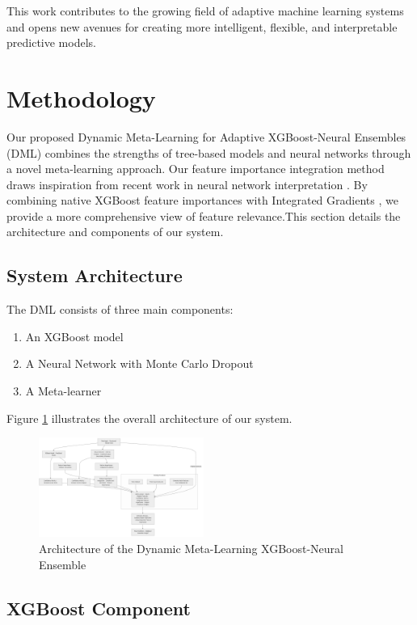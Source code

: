 \documentclass[10pt,journal,compsoc]{IEEEtran}
\begin{document}
This work contributes to the growing field of adaptive machine learning systems and opens new avenues for creating more intelligent, flexible, and interpretable predictive models.

\section{Methodology}

Our proposed Dynamic Meta-Learning for Adaptive XGBoost-Neural Ensembles (DML) combines the strengths of tree-based models and neural networks through a novel meta-learning approach. Our feature importance integration method draws inspiration from recent work in neural network interpretation \cite{shrikumar2017learning,lundberg2017unified}. By combining native XGBoost feature importances with Integrated Gradients \cite{sundararajan2017axiomatic}, we provide a more comprehensive view of feature relevance.This section details the architecture and components of our system.

\subsection{System Architecture}

The DML consists of three main components:
\begin{enumerate}
    \item An XGBoost model
    \item A Neural Network with Monte Carlo Dropout
    \item A Meta-learner
\end{enumerate}

Figure \ref{fig:architecture} illustrates the overall architecture of our system.

\begin{figure}[htbp]
\centerline{\includegraphics[width=0.48\textwidth]{architecture.png}}
\caption{Architecture of the Dynamic Meta-Learning XGBoost-Neural Ensemble}
\label{fig:architecture}
\end{figure}

\subsection{XGBoost Component}
\end{document}
